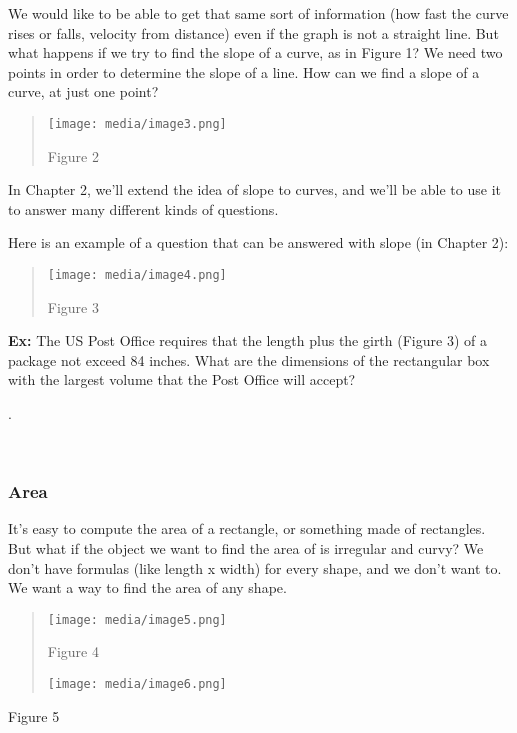 We would like to be able to get that same sort of information (how fast
the curve rises or falls, velocity from distance) even if the graph is
not a straight line. But what happens if we try to find the slope of a
curve, as in Figure 1? We need two points in order to determine the
slope of a line. How can we find a slope of a curve, at just one point?

\begin{quote}
\texttt{[image: media/image3.png]}

Figure 2
\end{quote}

In Chapter 2, we'll extend the idea of slope to curves, and we'll be
able to use it to answer many different kinds of questions.

Here is an example of a question that can be answered with slope (in
Chapter 2):

\begin{quote}
\texttt{[image: media/image4.png]}

Figure 3
\end{quote}

\textbf{Ex:} The US Post Office requires that the length plus the girth
(Figure 3) of a package not exceed 84 inches. What are the dimensions of
the rectangular box with the largest volume that the Post Office will
accept?

.

\textbf{\\
}

\subsubsection{\texorpdfstring{\textbf{Area}}{Area}}\label{area}

It's easy to compute the area of a rectangle, or something made of
rectangles. But what if the object we want to find the area of is
irregular and curvy? We don't have formulas (like length x width) for
every shape, and we don't want to. We want a way to find the area of any
shape.

\begin{quote}
\texttt{[image: media/image5.png]}

Figure 4

\texttt{[image: media/image6.png]}
\end{quote}

Figure 5

